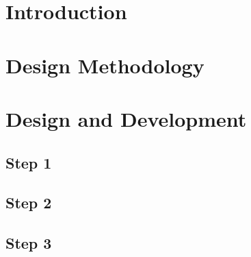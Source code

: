 \documentclass[12pt]{article}
\begin{document}


\newpage
{}
\section{Introduction}



\newpage
\section{Design Methodology}

	
\newpage
\section{Design and Development}

\subsection{Step 1}


\subsection{Step 2}


\subsection{Step 3}

\end{document}
